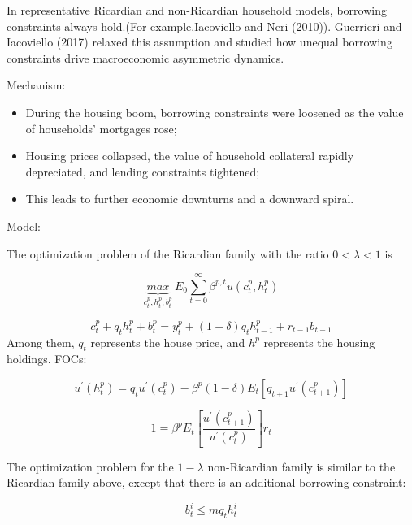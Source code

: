 \documentclass[10pt,math=newtx,citestyle=gb7714-2015,bibstyle=gb7714-2015]{elegantbook}
\begin{document}
In representative Ricardian and non-Ricardian household models, borrowing constraints always hold.(For example,Iacoviello and Neri (2010)). Guerrieri and Iacoviello (2017) relaxed this assumption and studied how unequal borrowing constraints drive macroeconomic asymmetric dynamics.

Mechanism:
\begin{itemize}
	\item During the housing boom, borrowing constraints were loosened as the value of households' mortgages rose;
	
	\item Housing prices collapsed, the value of household collateral rapidly depreciated, and lending constraints tightened;
	
	\item This leads to further economic downturns and a downward spiral.
\end{itemize}


Model:

The optimization problem of the Ricardian family with the ratio $0<\lambda<1$ is

\begin{equation}\label{label}
	\underbrace{max}_{c_t^p,h_t^p,b_t^p}~E_0\sum_{t=0}^{\infty}\beta^{p,t}u(c_t^p,h_t^p)
\end{equation}

\begin{equation}\label{label}
	c_t^p+q_th_t^p+b_t^p=y_t^p+(1-\delta)q_th_{t-1}^p+r_{t-1}b_{t-1}
\end{equation}
Among them, $q_t$ represents the house price, and $h^p$ represents the housing holdings.
FOCs:

\begin{equation}\label{label}
	u^{'}(h_t^p)=q_tu^{'}(c_t^p)-\beta^p(1-\delta)E_t[q_{t+1}u^{'}(c_{t+1}^p)]
\end{equation}

\begin{equation}\label{label}
	1=\beta^pE_t\left[\frac{u^{'}(c_{t+1}^p)}{u^{'}(c_{t}^p)}\right]r_t
\end{equation}

The optimization problem for the $1-\lambda$ non-Ricardian family is similar to the Ricardian family above, except that there is an additional borrowing constraint:

\begin{equation}\label{label}
	b_t^i\le mq_th_t^i
\end{equation}
\end{document}

